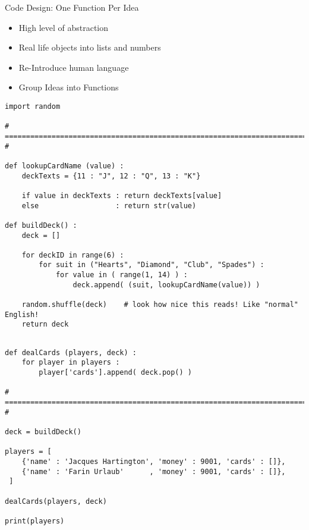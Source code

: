 
\begin{frame}{Code Design: One Function Per Idea}
%
\begin{itemize}
\item High level of abstraction
\item Real life objects into lists and numbers
\item Re-Introduce human language
\item Group Ideas into Functions
\end{itemize}
%
\end{frame}


\begin{frame}[fragile]
%
\begin{codebox}
\begin{verbatim}
import random

# =========================================================================== #

def lookupCardName (value) :
    deckTexts = {11 : "J", 12 : "Q", 13 : "K"}
        
    if value in deckTexts : return deckTexts[value]
    else                  : return str(value)
        
def buildDeck() :
    deck = []

    for deckID in range(6) :
        for suit in ("Hearts", "Diamond", "Club", "Spades") :
            for value in ( range(1, 14) ) :
                deck.append( (suit, lookupCardName(value)) )
    
    random.shuffle(deck)    # look how nice this reads! Like "normal" English!
    return deck
\end{verbatim}
\end{codebox}
%
\end{frame}


\begin{frame}[fragile]
%
\begin{codebox}
\begin{verbatim}

def dealCards (players, deck) :
    for player in players :
        player['cards'].append( deck.pop() )

# =========================================================================== #

deck = buildDeck()

players = [
    {'name' : 'Jacques Hartington', 'money' : 9001, 'cards' : []},
    {'name' : 'Farin Urlaub'      , 'money' : 9001, 'cards' : []},
 ]

dealCards(players, deck)

print(players)
\end{verbatim}
\end{codebox}
%
\end{frame}

